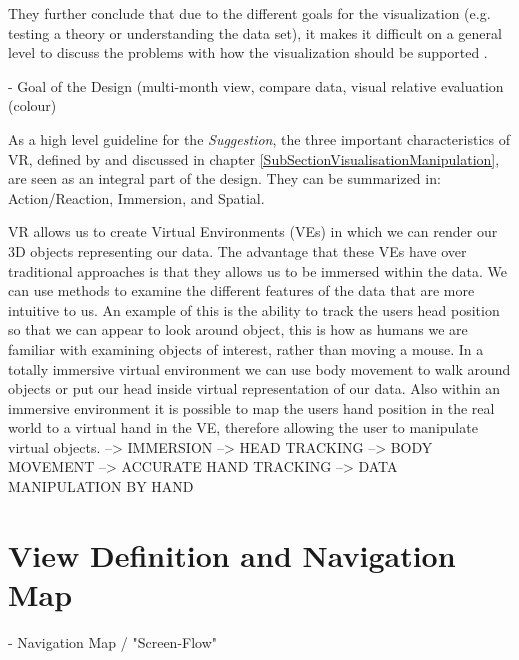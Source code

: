 They further conclude that due to the different goals for the visualization (e.g. testing a theory or understanding the data set), it makes it difficult on a general level to discuss the problems with how the visualization should be supported \citep{Stone1994}.


- Goal of the Design (multi-month view, compare data, visual relative evaluation (colour)

As a high level guideline for the \textit{Suggestion}, the three important characteristics of VR, defined by \cite{Stone1994} and discussed in chapter \ref{SubSectionVisualisationManipulation}, are seen as an integral part of the design. They can be summarized in: Action/Reaction, Immersion, and Spatial. \newline




VR allows us to create Virtual Environments (VEs) in which we can render our 3D objects representing our data. The advantage that these VEs have over traditional approaches is that they allows us to be immersed within the data. We can use methods to examine the different features of the data that are more intuitive to us. An example of this is the ability to track the users head position so that we can appear to look around object, this is how as humans we are familiar with examining objects of interest, rather than moving a mouse. In a totally immersive virtual environment we can use body movement to walk around objects or put our head inside virtual representation of our data. Also within an immersive environment it is possible to map the users hand position in the real world to a virtual hand in the VE, therefore allowing the user to manipulate virtual objects.
\cite{Jamieson2007}
--> IMMERSION
--> HEAD TRACKING
--> BODY MOVEMENT
--> ACCURATE HAND TRACKING
--> DATA MANIPULATION BY HAND





\section{View Definition and Navigation Map}


- Navigation Map / "Screen-Flow"



